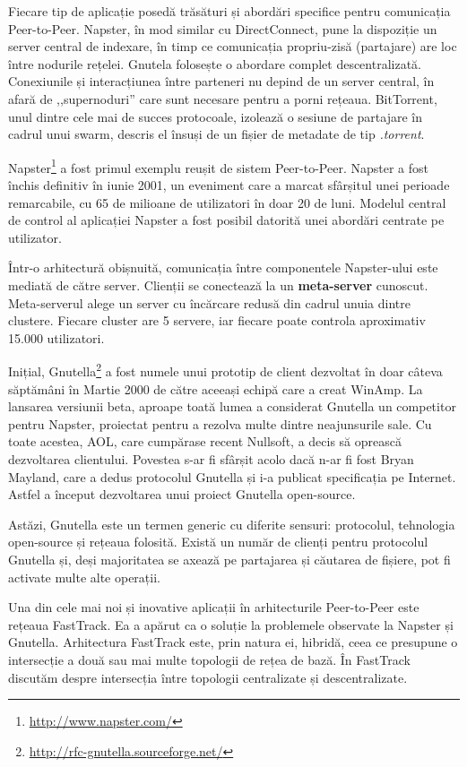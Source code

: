 Fiecare tip de aplicație posedă trăsături și abordări specifice pentru
comunicația Peer-to-Peer. Napster, în mod similar cu DirectConnect,
pune la dispoziție un server central de indexare, în timp ce comunicația
propriu-zisă (partajare) are loc între nodurile rețelei. Gnutela folosește
o abordare complet descentralizată. Conexiunile și interacțiunea
între parteneri nu depind de un server central, în afară de ,,supernoduri''
care sunt necesare pentru a porni rețeaua. BitTorrent, unul dintre cele
mai de succes protocoale, izolează o sesiune de partajare în cadrul unui
swarm, descris el însuși de un fișier de metadate de tip \textit{.torrent}.

Napster\footnote{\url{http://www.napster.com/}} a fost primul exemplu
reușit de sistem Peer-to-Peer. Napster a fost închis definitiv în iunie 2001,
un eveniment care a marcat sfârșitul unei perioade remarcabile, cu 65 de
milioane de utilizatori în doar 20 de luni. Modelul central de control
al aplicației Napster a fost posibil datorită unei abordări centrate pe
utilizator.

Într-o arhitectură obișnuită, comunicația între componentele Napster-ului
este mediată de către server. Clienții se conectează la un \textbf{meta-server}
cunoscut. Meta-serverul alege un server cu încărcare redusă din cadrul
unuia dintre clustere. Fiecare cluster are 5 servere, iar fiecare poate
controla aproximativ 15.000 utilizatori.

Inițial, Gnutella\footnote{\url{http://rfc-gnutella.sourceforge.net/}}
a fost numele unui prototip de client dezvoltat în doar câteva săptămâni
în Martie 2000 de către aceeași echipă care a creat WinAmp. La lansarea
versiunii beta, aproape toată lumea a considerat Gnutella un competitor
pentru Napster, proiectat pentru a rezolva multe dintre neajunsurile sale.
Cu toate acestea, AOL, care cumpărase recent Nullsoft, a decis să oprească
dezvoltarea clientului. Povestea s-ar fi sfârșit acolo dacă n-ar fi fost
Bryan Mayland, care a dedus protocolul Gnutella și i-a publicat specificația
pe Internet. Astfel a început dezvoltarea unui proiect Gnutella open-source.

Astăzi, Gnutella este un termen generic cu diferite sensuri: protocolul,
tehnologia open-source și rețeaua folosită. Există un număr de clienți pentru
protocolul Gnutella și, deși majoritatea se axează pe partajarea și
căutarea de fișiere, pot fi activate multe alte operații.

Una din cele mai noi și inovative aplicații în arhitecturile Peer-to-Peer este
rețeaua FastTrack. Ea a apărut ca o soluție la problemele observate la Napster
și Gnutella. Arhitectura FastTrack este, prin natura ei, hibridă, ceea ce
presupune o intersecție a două sau mai multe topologii de rețea de bază. În
FastTrack discutăm despre intersecția între topologii centralizate și
descentralizate.

